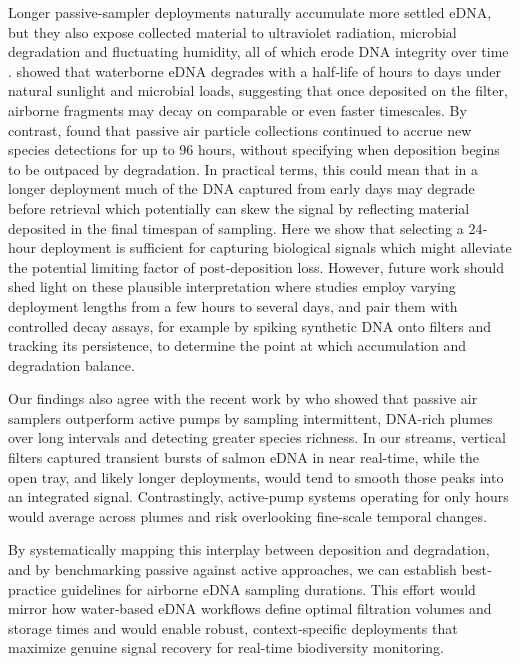 \documentclass{article}
\begin{document}
Longer passive‐sampler deployments naturally accumulate more settled eDNA, but they also expose collected material to ultraviolet radiation, microbial degradation and fluctuating humidity, all of which erode DNA integrity over time \cite{brandao-dias2023}. \cite{strickler2015} showed that waterborne eDNA degrades with a half‐life of hours to days under natural sunlight and microbial loads, suggesting that once deposited on the filter, airborne fragments may decay on comparable or even faster timescales. By contrast, \cite{klepke2022} found that passive air particle collections continued to accrue new species detections for up to 96 hours, without specifying when deposition begins to be outpaced by degradation. In practical terms, this could mean that in a longer deployment much of the DNA captured from early days may degrade before retrieval which potentially can skew the signal by reflecting material deposited in the final timespan of sampling. Here we show that selecting a 24‐hour deployment is sufficient for capturing biological signals which might alleviate the potential limiting factor of post‐deposition loss\cite{johnson2023}. However, future work should shed light on these plausible interpretation where studies employ varying deployment lengths from a few hours to several days, and pair them with controlled decay assays, for example by spiking synthetic DNA onto filters and tracking its persistence, to determine the point at which accumulation and degradation balance.

Our findings also agree with the recent work by \cite{jager2025} who showed that passive air samplers outperform active pumps by sampling intermittent, DNA-rich plumes over long intervals and detecting greater species richness. In our streams, vertical filters captured transient bursts of salmon eDNA in near real-time, while the open tray, and likely longer deployments, would tend to smooth those peaks into an integrated signal. Contrastingly, active-pump systems operating for only hours would average across plumes and risk overlooking fine-scale temporal changes.

By systematically mapping this interplay between deposition and degradation, and by benchmarking passive against active approaches, we can establish best‐practice guidelines for airborne eDNA sampling durations. This effort would mirror how water‐based eDNA workflows define optimal filtration volumes and storage times \cite{barnes2016, altermatt2025} and would enable robust, context‐specific deployments that maximize genuine signal recovery for real‐time biodiversity monitoring.
\end{document}
